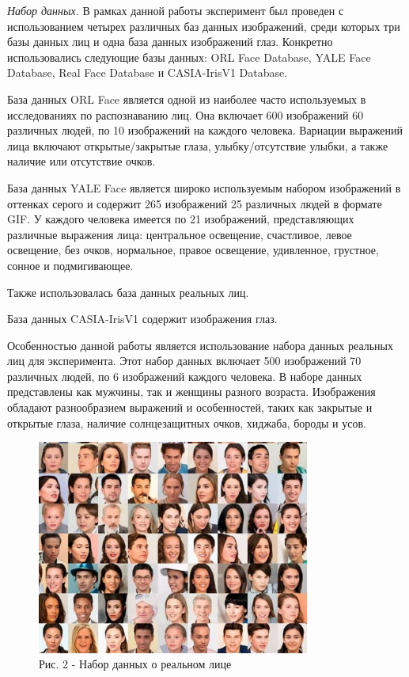 \begin{multicols}{2}
\emph{Набор данных.} В рамках данной работы эксперимент был проведен с
использованием четырех различных баз данных изображений, среди которых
три базы данных лиц и одна база данных изображений глаз. Конкретно
использовались следующие базы данных: ORL Face Database, YALE Face
Database, Real Face Database и CASIA-IrisV1 Database.

База данных ORL Face является одной из наиболее часто используемых в
исследованиях по распознаванию лиц. Она включает 600 изображений 60
различных людей, по 10 изображений на каждого человека. Вариации
выражений лица включают открытые/закрытые глаза, улыбку/отсутствие
улыбки, а также наличие или отсутствие очков.

База данных YALE Face является широко используемым набором изображений в
оттенках серого и содержит 265 изображений 25 различных людей в формате
GIF. У каждого человека имеется по 21 изображений, представляющих
различные выражения лица: центральное освещение, счастливое, левое
освещение, без очков, нормальное, правое освещение, удивленное,
грустное, сонное и подмигивающее.

Также использовалась база данных реальных лиц.

База данных CASIA-IrisV1 содержит изображения глаз.

Особенностью данной работы является использование набора данных реальных
лиц для эксперимента. Этот набор данных включает 500 изображений 70
различных людей, по 6 изображений каждого человека. В наборе данных
представлены как мужчины, так и женщины разного возраста. Изображения
обладают разнообразием выражений и особенностей, таких как закрытые и
открытые глаза, наличие солнцезащитных очков, хиджаба, бороды и усов.
\end{multicols}

\begin{figure}[H]
	\centering
	\includegraphics[width=0.8\textwidth]{assets/84}
	\caption*{Рис. 2 - Набор данных о реальном лице}
\end{figure}

